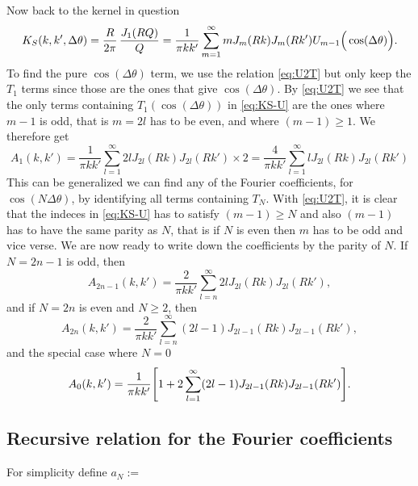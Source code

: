 \documentclass[11pt,a4paper, 
swedish, english %
]{article}
\begin{document}
Now back to the kernel in question
\begin{equation}\label{eq:KS-U}
K_S(k, k', \Delta\theta) = \frac{R}{2\pi}\,\frac{J_1\qty(RQ)}{Q}
=\frac{1}{\pi kk'} \sum_{m=1}^\infty m
J_m(Rk)J_m(Rk') U_{m-1}\Big(\cos(\Delta\theta)\Big).
\end{equation}
To find the pure $\cos(\Delta\theta)$ term, we use the relation
\eqref{eq:U2T} but only keep the $T_1$ terms since those are the ones
that give $\cos(\Delta\theta)$. By \eqref{eq:U2T} we see that the
only terms containing $T_1(\cos(\Delta\theta))$ in \eqref{eq:KS-U} are
the ones where $m-1$ is odd, that is $m=2l$ has to be even, and where
$(m-1)\ge1$. We therefore get
\begin{equation}
A_1(k, k') = \frac{1}{\pi kk'} \sum_{l=1}^\infty 2l
J_{2l}(Rk)J_{2l}(Rk') \times2
=\frac{4}{\pi kk'} \sum_{l=1}^\infty l
J_{2l}(Rk)J_{2l}(Rk') 
\end{equation}
This can be generalized we can find any of the Fourier coefficients, for
$\cos(N\Delta\theta)$, by identifying all terms containing $T_N$. With
\eqref{eq:U2T}, it is clear that the indeces in \eqref{eq:KS-U} has to
satisfy $(m-1)\ge N$ and also $(m-1)$ has to have the same parity as
$N$, that is if $N$ is even then $m$ has to be odd and vice verse. We
are now ready to write down the coefficients by the parity of $N$. 
If $N=2n-1$ is odd, then
\begin{equation}
A_{2n-1}(k, k') = \frac{2}{\pi kk'} 
\sum_{l=n}^\infty 2l J_{2l}(Rk)J_{2l}(Rk'),
\end{equation}
and if $N=2n$ is even and $N\ge2$, then
\begin{equation}
A_{2n}(k, k') = \frac{2}{\pi kk'} 
\sum_{l=n}^\infty (2l-1) J_{2l-1}(Rk)J_{2l-1}(Rk'),
\end{equation}
and the special case where $N=0$
\begin{equation}
A_{0}(k, k') = \frac{1}{\pi kk'} 
\qty[1+2\sum_{l=1}^\infty (2l-1) J_{2l-1}(Rk)J_{2l-1}(Rk')].
\end{equation}

\subsection{Recursive relation for the Fourier coefficients}
For simplicity define $a_N:=$





\end{document}
